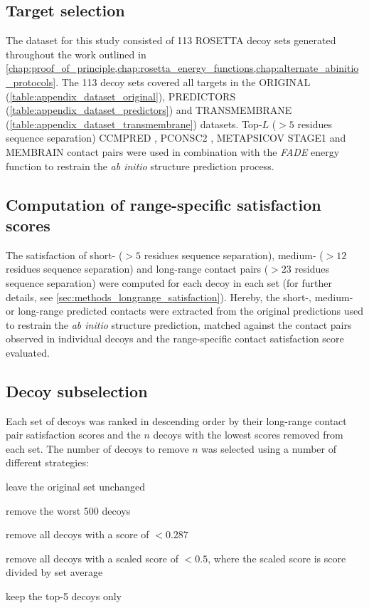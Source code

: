 \subsection{Target selection}
The dataset for this study consisted of 113 ROSETTA decoy sets generated throughout the work outlined in \cref{chap:proof_of_principle,chap:rosetta_energy_functions,chap:alternate_abinitio_protocols}. The 113 decoy sets covered all targets in the ORIGINAL (\cref{table:appendix_dataset_original}), PREDICTORS (\cref{table:appendix_dataset_predictors}) and TRANSMEMBRANE (\cref{table:appendix_dataset_transmembrane}) datasets. Top-$L$ ($>5$ residues sequence separation) CCMPRED \cite{Seemayer2014-zp}, PCONSC2 \cite{Skwark2014-qp}, METAPSICOV STAGE1 \cite{Jones2015-vq} and MEMBRAIN \cite{Yang2013-bf} contact pairs were used in combination with the \textit{FADE} energy function to restrain the \textit{ab initio} structure prediction process.

\subsection{Computation of range-specific satisfaction scores}
The satisfaction of short- ($>5$ residues sequence separation), medium- ($>12$ residues sequence separation) and long-range contact pairs ($>23$ residues sequence separation) were computed for each decoy in each set (for further details, see \cref{sec:methods_longrange_satisfaction}). Hereby, the short-, medium- or long-range predicted contacts were extracted from the original predictions used to restrain the \textit{ab initio} structure prediction, matched against the contact pairs observed in individual decoys and the range-specific contact satisfaction score evaluated. 

\subsection{Decoy subselection} \label{sec:ample_decoys_decoy_selection}
Each set of decoys was ranked in descending order by their long-range contact pair satisfaction scores and the $n$ decoys with the lowest scores removed from each set. The number of decoys to remove $n$ was selected using a number of different strategies:

\begin{description}[style=multiline,leftmargin=4cm]
    \item[\textit{NONE}] leave the original set unchanged
    \item[\textit{LINEAR}] remove the worst 500 decoys
    \item[\textit{CUTOFF}] remove all decoys with a score of $<0.287$ 
    \item[\textit{SCALED}] remove all decoys with a scaled score of $<0.5$, where the scaled score is score divided by set average
    \item[\textit{INDIVIDUAL}] keep the top-5 decoys only
\end{description}


